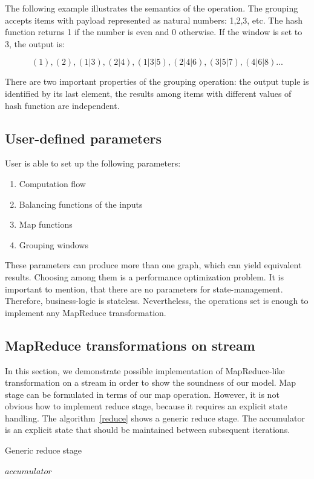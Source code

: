 The following example illustrates the semantics of the operation. The grouping accepts items with payload represented as natural numbers: 1,2,3, etc. The hash function returns 1 if the number is even and 0 otherwise. If the window is set to 3, the output is:

\[(1), (2), (1|3), (2|4), (1|3|5), (2|4|6), (3|5|7), (4|6|8)...\]

There are two important properties of the grouping operation: the output tuple is identified by its last element, the results among items with different values of hash function are independent.

\subsection{User-defined parameters}

User is able to set up the following parameters:

\begin{enumerate}
  \item{Computation flow}
  \item{Balancing functions of the inputs}
  \item{Map functions}
  \item{Grouping windows}
\end{enumerate}

These parameters can produce more than one graph, which can yield equivalent results. Choosing among them is a performance optimization problem.    
It is important to mention, that there are no parameters for state-management. Therefore, business-logic is stateless. Nevertheless, the operations set is enough to implement any MapReduce transformation.

\subsection{MapReduce transformations on stream}
\label{fs-map-reduce}

In this section, we demonstrate possible implementation of MapReduce-like transformation on a stream in order to show the soundness of our model. Map stage can be formulated in terms of our map operation. However, it is not obvious how to implement reduce stage, because it requires an explicit state handling. The algorithm~\ref{reduce} shows a generic reduce stage. The accumulator is an explicit state that should be maintained between subsequent iterations.

\begin{algorithm}
\caption{Generic reduce stage}
\label{reduce}
\begin{algorithmic}
    \State $accumulator$ 
      \State {}
    \EndFor
    \State \Return {}
  \EndFunction
\end{algorithmic}
\end{algorithm}

